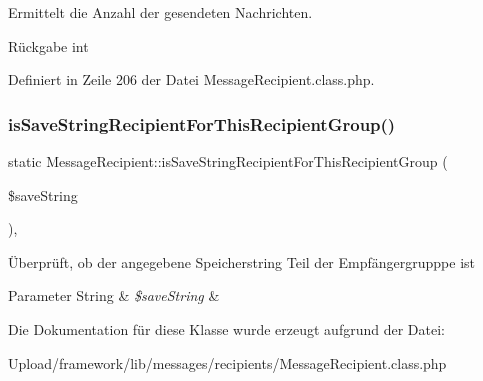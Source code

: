Ermittelt die Anzahl der gesendeten Nachrichten. \begin{DoxyReturn}{Rückgabe}
int 
\end{DoxyReturn}


Definiert in Zeile 206 der Datei Message\+Recipient.\+class.\+php.

\mbox{\label{class_message_recipient_ad2319ccbb714795150888063e729f728}} 
\subsubsection{\texorpdfstring{is\+Save\+String\+Recipient\+For\+This\+Recipient\+Group()}{isSaveStringRecipientForThisRecipientGroup()}}
{\footnotesize\ttfamily static Message\+Recipient\+::is\+Save\+String\+Recipient\+For\+This\+Recipient\+Group (\begin{DoxyParamCaption}\item[{}]{\$save\+String }\end{DoxyParamCaption})\hspace{0.3cm}{\ttfamily [static]}, {\ttfamily [abstract]}}

Überprüft, ob der angegebene Speicherstring Teil der Empfängergrupppe ist 
\begin{DoxyParams}[1]{Parameter}
String & {\em \$save\+String} & \\
\hline
\end{DoxyParams}


Die Dokumentation für diese Klasse wurde erzeugt aufgrund der Datei\+:\begin{DoxyCompactItemize}
\item 
Upload/framework/lib/messages/recipients/Message\+Recipient.\+class.\+php\end{DoxyCompactItemize}
